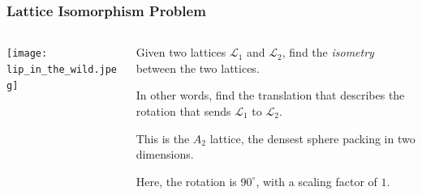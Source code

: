 \documentclass[
aspectratio=169, %
t, %
onlytextwidth, %
10pt, %
]{beamer}
\begin{document}

\begin{frame}
    \frametitle{Lattice Isomorphism Problem}
    \begin{columns}[T] %
        \begin{column}{0.48\linewidth} %
            \texttt{[image: lip\_in\_the\_wild.jpeg]} %
        \end{column}
        \begin{column}{0.48\linewidth}
            \begin{tcolorbox}[colback=ICLBlue!5!white,colframe=ICLBlue,title=Lattice Isomorphism Problem (LIP)]
                Given two lattices $\mathcal{L}_1$ and $\mathcal{L}_2$, find the \textit{isometry} between the two lattices.

                In other words, find the translation that describes the rotation that sends $\mathcal{L}_1$ to $\mathcal{L}_2$.
            \end{tcolorbox}
            This is the $A_2$ lattice, the densest sphere packing in two dimensions.

            Here, the rotation is $90^\circ$, with a scaling factor of $1$.
        \end{column}
    \end{columns}
\end{frame}

\end{document}
